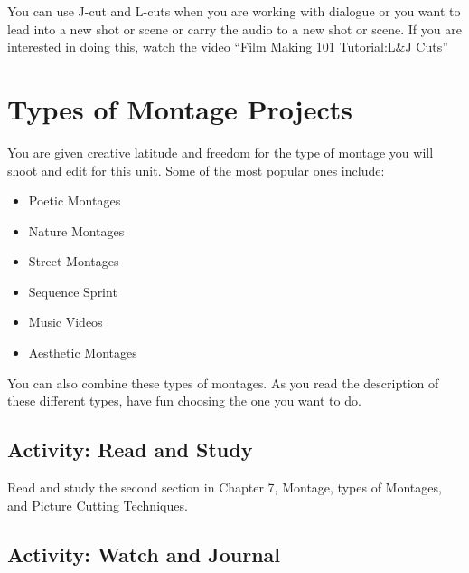 \documentclass[
]{book}
\providecommand{\tightlist}{%
  \setlength{\itemsep}{0pt}\setlength{\parskip}{0pt}}
\begin{document}
You can use J-cut and L-cuts when you are working with dialogue or you want to lead into a new shot or scene or carry the audio to a new shot or scene. If you are interested in doing this, watch the video \href{https://www.youtube.com/watch?v=PAvJevWUVsc}{``Film Making 101 Tutorial:L\&J Cuts''}

\hypertarget{types-of-montage-projects}{%
\section{Types of Montage Projects}\label{types-of-montage-projects}}

You are given creative latitude and freedom for the type of montage you will shoot and edit for this unit. Some of the most popular ones include:

\begin{itemize}
\tightlist
\item
  Poetic Montages
\item
  Nature Montages
\item
  Street Montages
\item
  Sequence Sprint
\item
  Music Videos
\item
  Aesthetic Montages
\end{itemize}

You can also combine these types of montages. As you read the description of these different types, have fun choosing the one you want to do.

\hypertarget{activity-read-and-study-2}{%
\subsection*{Activity: Read and Study}\label{activity-read-and-study-2}}

\begin{reflect}
Read and study the second section in Chapter 7, Montage, types of Montages, and Picture Cutting Techniques.
\end{reflect}

\hypertarget{activity-watch-and-journal}{%
\subsection*{Activity: Watch and Journal}\label{activity-watch-and-journal}}
\end{document}
